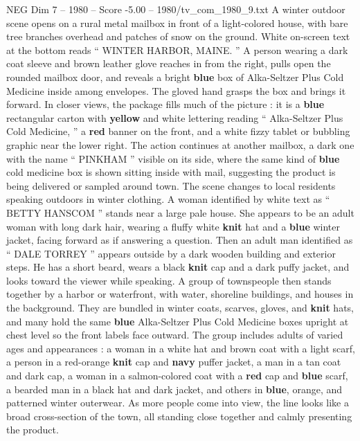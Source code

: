 \begin{textsample}{NEG Dim 7 – 1980 – Score -5.00 – 1980/tv\_com\_1980\_9.txt}  \label{ex:f7_neg_053}
A winter outdoor scene opens on a rural metal mailbox in front of a light-colored house, with bare tree branches overhead and patches of snow on the ground.
White on-screen text at the bottom reads “ WINTER HARBOR, MAINE. ” A person wearing a dark coat sleeve and brown leather glove reaches in from the right, pulls open the rounded mailbox door, and reveals a bright \textbf{blue} box of Alka-Seltzer Plus Cold Medicine inside among envelopes.
The gloved hand grasps the box and brings it forward.
In closer views, the package fills much of the picture : it is a \textbf{blue} rectangular carton with \textbf{yellow} and white lettering reading “ Alka-Seltzer Plus Cold Medicine, ” a \textbf{red} banner on the front, and a white fizzy tablet or bubbling graphic near the lower right.
The action continues at another mailbox, a dark one with the name “ PINKHAM ” visible on its side, where the same kind of \textbf{blue} cold medicine box is shown sitting inside with mail, suggesting the product is being delivered or sampled around town.
The scene changes to local residents speaking outdoors in winter clothing.
A woman identified by white text as “ BETTY HANSCOM ” stands near a large pale house.
She appears to be an adult woman with long dark hair, wearing a fluffy white \textbf{knit} hat and a \textbf{blue} winter jacket, facing forward as if answering a question.
Then an adult man identified as “ DALE TORREY ” appears outside by a dark wooden building and exterior steps.
He has a short beard, wears a black \textbf{knit} cap and a dark puffy jacket, and looks toward the viewer while speaking.
A group of townspeople then stands together by a harbor or waterfront, with water, shoreline buildings, and houses in the background.
They are bundled in winter coats, scarves, gloves, and \textbf{knit} hats, and many hold the same \textbf{blue} Alka-Seltzer Plus Cold Medicine boxes upright at chest level so the front labels face outward.
The group includes adults of varied ages and appearances : a woman in a white hat and brown coat with a light scarf, a person in a red-orange \textbf{knit} cap and \textbf{navy} puffer jacket, a man in a tan coat and dark cap, a woman in a salmon-colored coat with a \textbf{red} cap and \textbf{blue} scarf, a bearded man in a black hat and dark jacket, and others in \textbf{blue}, orange, and patterned winter outerwear.
As more people come into view, the line looks like a broad cross-section of the town, all standing close together and calmly presenting the product.

\end{textsample}
